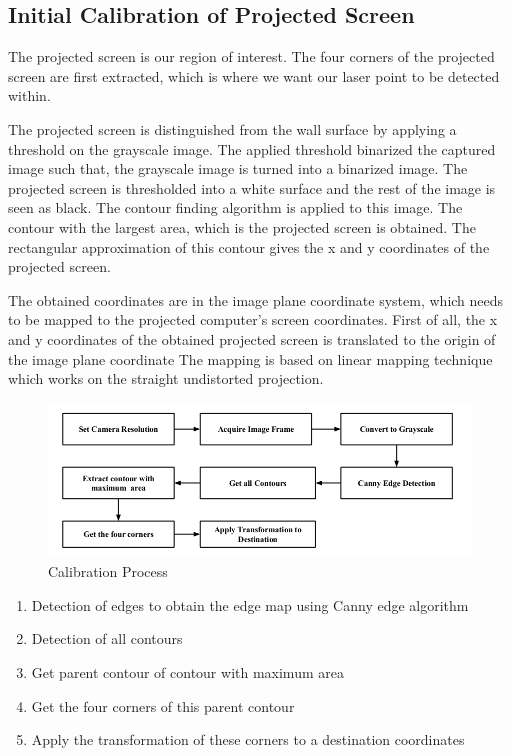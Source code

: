\documentclass[12pt, a4paper]{article}
\begin{document}
\subsection{Initial Calibration of Projected Screen}
	 The projected screen is our region of interest. The four corners of the projected screen are first extracted, which is where we want our laser point to be detected within. 
	 
    The projected screen is distinguished from the wall surface by applying a threshold on the grayscale image. The applied threshold binarized the captured image such that, the grayscale image is turned into a binarized image. The projected screen is thresholded into a white surface and the rest of the image is seen as black. The contour finding algorithm is applied to this image. The contour with the largest area, which is the projected screen is obtained. The rectangular approximation of this contour gives the x and y coordinates of the projected screen. 
    
    The obtained coordinates are in the image plane coordinate system, which needs to be mapped to the projected computer’s screen coordinates. First of all, the x and y coordinates of the obtained projected screen is translated to the origin of the image plane coordinate 
The mapping is based on linear mapping technique which works on the straight undistorted projection. 

\begin{figure}[htp]
	\centering
	\includegraphics[scale=0.50]{Calibration.png}
	\caption{Calibration Process}
	\label{}
\end{figure}

\begin{enumerate}
\item Detection of edges to obtain the edge map using Canny edge algorithm
\item Detection of all contours
\item Get parent contour of contour with maximum area
\item Get the four corners of this parent contour
\item Apply the  transformation of these corners to a destination coordinates
\end{enumerate}
	
\end{document}

